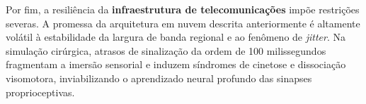 Por fim, a resiliência da \textbf{infraestrutura de telecomunicações} impõe restrições severas. A promessa da arquitetura em nuvem descrita anteriormente é altamente volátil à estabilidade da largura de banda regional e ao fenômeno de \textit{jitter}. Na simulação cirúrgica, atrasos de sinalização da ordem de 100 milissegundos fragmentam a imersão sensorial e induzem síndromes de cinetose e dissociação visomotora, inviabilizando o aprendizado neural profundo das sinapses proprioceptivas.
